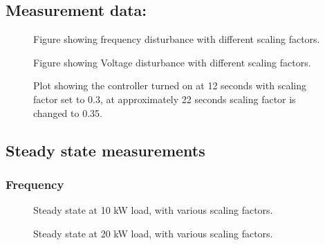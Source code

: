 \subsection*{Measurement data:}


% 

\begin{figure}[H]
\centering

\caption{Figure showing frequency disturbance with different scaling factors.}
\label{fig:test11-14freq}
\end{figure}

\begin{figure}[H]
\centering

\caption{Figure showing Voltage disturbance with different scaling factors.}
\label{fig:test11-14volt}
\end{figure}

\begin{figure}[H]
\centering

\caption{Plot showing the controller turned on at 12 seconds with scaling factor set to 0.3, at approximately 22 seconds  scaling factor is changed to 0.35.}
\label{fig:test15-instablecontroller}
\end{figure}

\subsection{Steady state measurements}
\subsubsection{Frequency}

\begin{figure}[H]
\centering

\caption{Steady state at 10 kW load, with various scaling factors.}
\label{fig:test11-14steadyfrequency10kw}
\end{figure}

\begin{figure}[H]
\centering

\caption{Steady state at 20 kW load, with various scaling factors.}
\label{fig:test11-14steadyfrequency20kw}
\end{figure}

